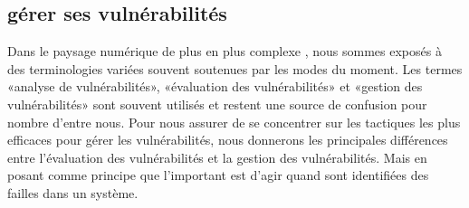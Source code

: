 \subsection{gérer ses vulnérabilités}
\label{CHAP_GESTVUL}


Dans le paysage numérique de plus en plus complexe , nous sommes exposés à des terminologies variées souvent soutenues par les modes du moment. Les termes «analyse de vulnérabilités», «évaluation des vulnérabilités» et «gestion des vulnérabilités» sont souvent utilisés et restent une source de confusion pour nombre d’entre nous. Pour nous assurer de se concentrer sur les tactiques les plus efficaces pour gérer les vulnérabilités, nous donnerons les principales différences entre l’évaluation des vulnérabilités et la gestion des vulnérabilités. Mais en posant comme principe que l'important est d'agir quand sont identifiées des failles dans un système.

